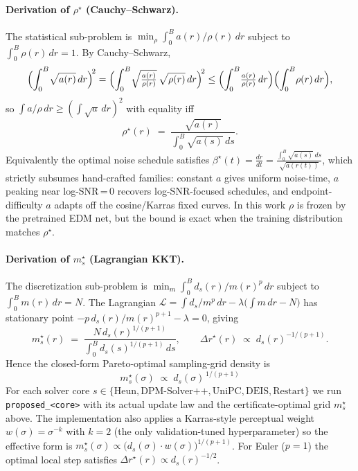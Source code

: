 \documentclass[11pt]{article}
\begin{document}
\paragraph{Derivation of \(\rho^\star\) (Cauchy--Schwarz).} The statistical
sub-problem is
\(\min_{\rho}\!\int_0^B a(r)/\rho(r)\,dr\) subject to \(\int_0^B \rho(r)\,dr = 1\).
By Cauchy--Schwarz,
\[
\Bigl(\int_0^B \!\sqrt{a(r)}\,dr\Bigr)^{\!2}
=
\Bigl(\int_0^B \!\sqrt{\tfrac{a(r)}{\rho(r)}}\,\sqrt{\rho(r)}\,dr\Bigr)^{\!2}
\le
\Bigl(\int_0^B \!\tfrac{a(r)}{\rho(r)}\,dr\Bigr)
\Bigl(\int_0^B \!\rho(r)\,dr\Bigr),
\]
so \(\int a/\rho\,dr \ge (\!\int\!\sqrt{a}\,dr)^{2}\) with equality iff
\[
\rho^\star(r) \;=\; \frac{\sqrt{a(r)}}{\int_0^B \sqrt{a(s)}\,ds}.
\]
Equivalently the optimal noise schedule satisfies
\(\beta^\star(t)=\frac{dr}{dt}=\frac{\int_0^B\sqrt{a(s)}\,ds}{\sqrt{a(r(t))}}\),
which strictly subsumes hand-crafted families: constant \(a\) gives
uniform noise-time, \(a\) peaking near log-SNR\,=\,0 recovers
log-SNR-focused schedules, and endpoint-difficulty \(a\) adapts off the
cosine/Karras fixed curves. In this work \(\rho\) is frozen by the
pretrained EDM net, but the bound is exact when the training distribution
matches \(\rho^\star\).

\paragraph{Derivation of \(m^\star_s\) (Lagrangian KKT).} The
discretization sub-problem is
\(\min_{m}\!\int_0^B d_s(r)/m(r)^p\,dr\) subject to \(\int_0^B m(r)\,dr = N\).
The Lagrangian
\(\mathcal L = \int d_s/m^p\,dr - \lambda\bigl(\int m\,dr - N\bigr)\)
has stationary point \(-p\,d_s(r)/m(r)^{p+1} - \lambda = 0\), giving
\[
m^\star_s(r) \;=\; \frac{N\,d_s(r)^{1/(p+1)}}{\int_0^B d_s(s)^{1/(p+1)}\,ds},
\qquad
\Delta r^\star(r) \;\propto\; d_s(r)^{-1/(p+1)}.
\]
Hence the closed-form Pareto-optimal sampling-grid density is
\[
\boxed{\;\;
m^\star_s(\sigma)
\;\propto\;
d_s(\sigma)^{\,1/(p+1)}
\;\;}
\]
For each solver core \(s\in\{\mathrm{Heun},\mathrm{DPM\text{-}Solver\text{++}},\mathrm{UniPC},\mathrm{DEIS},\mathrm{Restart}\}\) we run \texttt{proposed\_<core>} with its actual update law and the certificate-optimal grid \(m^\star_s\) above. The implementation also applies a Karras-style perceptual weight \(w(\sigma)=\sigma^{-k}\) with \(k=2\) (the only validation-tuned hyperparameter) so the effective form is \(m^\star_s(\sigma)\propto\!\bigl(d_s(\sigma)\!\cdot\!w(\sigma)\bigr)^{1/(p+1)}\). For Euler (\(p=1\)) the optimal local step satisfies \(\Delta r^\star(r) \propto d_s(r)^{-1/2}\).
\end{document}
